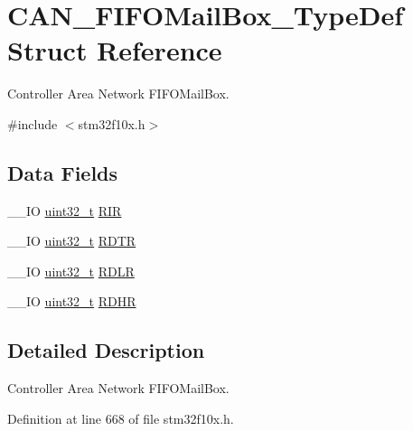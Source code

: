 \hypertarget{struct_c_a_n___f_i_f_o_mail_box___type_def}{\section{C\-A\-N\-\_\-\-F\-I\-F\-O\-Mail\-Box\-\_\-\-Type\-Def Struct Reference}
\label{struct_c_a_n___f_i_f_o_mail_box___type_def}
}


Controller Area Network F\-I\-F\-O\-Mail\-Box.  




{\ttfamily \#include $<$stm32f10x.\-h$>$}

\subsection*{Data Fields}
\begin{DoxyCompactItemize}
\item 
\-\_\-\-\_\-\-I\-O \hyperlink{stdint_8h_a435d1572bf3f880d55459d9805097f62}{uint32\-\_\-t} \hyperlink{struct_c_a_n___f_i_f_o_mail_box___type_def_a034504d43f7b16b320745a25b3a8f12d}{R\-I\-R}
\item 
\-\_\-\-\_\-\-I\-O \hyperlink{stdint_8h_a435d1572bf3f880d55459d9805097f62}{uint32\-\_\-t} \hyperlink{struct_c_a_n___f_i_f_o_mail_box___type_def_a49d74ca8b402c2b9596bfcbe4cd051a9}{R\-D\-T\-R}
\item 
\-\_\-\-\_\-\-I\-O \hyperlink{stdint_8h_a435d1572bf3f880d55459d9805097f62}{uint32\-\_\-t} \hyperlink{struct_c_a_n___f_i_f_o_mail_box___type_def_ac7d62861de29d0b4fcf11fabbdbd76e7}{R\-D\-L\-R}
\item 
\-\_\-\-\_\-\-I\-O \hyperlink{stdint_8h_a435d1572bf3f880d55459d9805097f62}{uint32\-\_\-t} \hyperlink{struct_c_a_n___f_i_f_o_mail_box___type_def_a95890984bd67845015d40e82fb091c93}{R\-D\-H\-R}
\end{DoxyCompactItemize}


\subsection{Detailed Description}
Controller Area Network F\-I\-F\-O\-Mail\-Box. 

Definition at line 668 of file stm32f10x.\-h.



